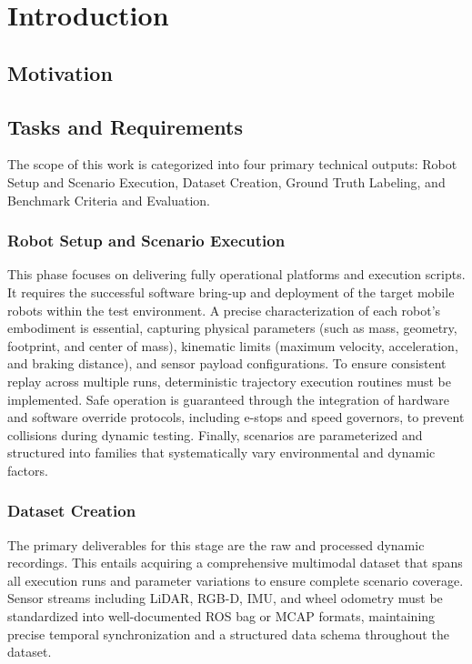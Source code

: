 \section{Introduction}

\subsection{Motivation}

\subsection{Tasks and Requirements}

The scope of this work is categorized into four primary technical outputs: Robot Setup and Scenario Execution, Dataset Creation, Ground Truth Labeling, and Benchmark Criteria and Evaluation.

\subsubsection{Robot Setup and Scenario Execution}
This phase focuses on delivering fully operational platforms and execution scripts. It requires the successful software bring-up and deployment of the target mobile robots within the test environment. A precise characterization of each robot's embodiment is essential, capturing physical parameters (such as mass, geometry, footprint, and center of mass), kinematic limits (maximum velocity, acceleration, and braking distance), and sensor payload configurations. To ensure consistent replay across multiple runs, deterministic trajectory execution routines must be implemented. Safe operation is guaranteed through the integration of hardware and software override protocols, including e-stops and speed governors, to prevent collisions during dynamic testing. Finally, scenarios are parameterized and structured into families that systematically vary environmental and dynamic factors.

\subsubsection{Dataset Creation}
The primary deliverables for this stage are the raw and processed dynamic recordings. This entails acquiring a comprehensive multimodal dataset that spans all execution runs and parameter variations to ensure complete scenario coverage. Sensor streams including LiDAR, RGB-D, IMU, and wheel odometry must be standardized into well-documented ROS bag or MCAP formats, maintaining precise temporal synchronization and a structured data schema throughout the dataset.

